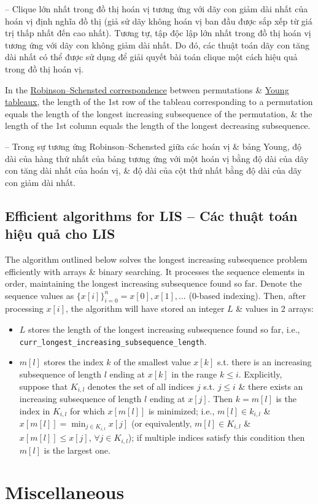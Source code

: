 \documentclass{article}
\begin{document}
-- Clique lớn nhất trong đồ thị hoán vị tương ứng với dãy con giảm dài nhất của hoán vị định nghĩa đồ thị (giả sử dãy không hoán vị ban đầu được sắp xếp từ giá trị thấp nhất đến cao nhất). Tương tự, tập độc lập lớn nhất trong đồ thị hoán vị tương ứng với dãy con không giảm dài nhất. Do đó, các thuật toán dãy con tăng dài nhất có thể được sử dụng để giải quyết bài toán clique một cách hiệu quả trong đồ thị hoán vị.

In the \href{https://en.wikipedia.org/wiki/Robinson%E2%80%93Schensted_correspondence}{Robinson--Schensted correspondence} between permutations \& \href{https://en.wikipedia.org/wiki/Young_tableau}{Young tableaux}, the length of the 1st row of the tableau corresponding to a permutation equals the length of the longest increasing subsequence of the permutation, \& the length of the 1st column equals the length of the longest decreasing subsequence.

-- Trong sự tương ứng Robinson--Schensted giữa các hoán vị \& bảng Young, độ dài của hàng thứ nhất của bảng tương ứng với một hoán vị bằng độ dài của dãy con tăng dài nhất của hoán vị, \& độ dài của cột thứ nhất bằng độ dài của dãy con giảm dài nhất.


\subsection{Efficient algorithms for LIS -- Các thuật toán hiệu quả cho LIS}
The algorithm outlined below solves the longest increasing subsequence problem efficiently with arrays \& binary searching. It processes the sequence elements in order, maintaining the longest increasing subsequence found so far. Denote the sequence values as $\{x[i]\}_{i=0}^n = x[0],x[1],\ldots$ (0-based indexing). Then, after processing $x[i]$, the algorithm will have stored an integer $L$ \& values in 2 arrays:
\begin{itemize}
    \item $L$ stores the length of the longest increasing subsequence found so far, i.e., \verb|curr_longest_increasing_subsequence_length|.
    \item $m[l]$ stores the index $k$ of the smallest value $x[k]$ s.t. there is an increasing subsequence of length $l$ ending at $x[k]$ in the range $k\le i$. Explicitly, suppose that $K_{i,l}$ denotes the set of all indices $j$ s.t. $j\le i$ \& there exists an increasing subsequence of length $l$ ending at $x[j]$. Then $k = m[l]$ is the index in $K_{i,l}$ for which $x[m[l]]$ is minimized; i.e., $m[l]\in k_{i,l}$ \& $x[m[l]] = \min_{j\in K_{i,l}} x[j]$ (or equivalently, $m[l]\in K_{i,l}$ \& $x[m[l]]\le x[j]$, $\forall j\in K_{i,l}$); if multiple indices satisfy this condition then $m[l]$ is the largest one.
\end{itemize}


\section{Miscellaneous}


\printbibliography[heading=bibintoc]
\end{document}
